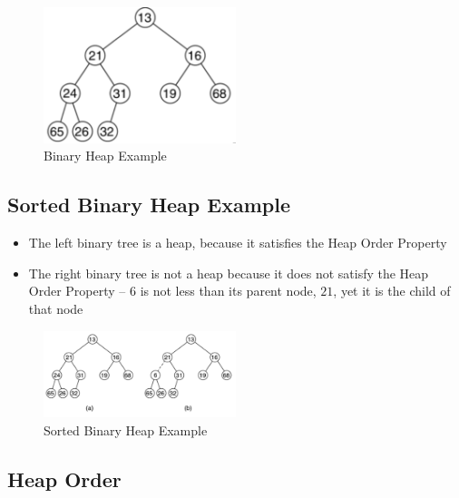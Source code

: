 \documentclass[
  10pt,
  english,
  letterpaper,
,tablecaptionabove
]{scrartcl}
\providecommand{\tightlist}{%
  \setlength{\itemsep}{0pt}\setlength{\parskip}{0pt}}
\begin{document}
\begin{figure}
\centering
\includegraphics[width=0.5\textwidth,height=\textheight]{images/2.png}
\caption{Binary Heap Example}
\end{figure}

\hypertarget{sorted-binary-heap-example}{%
\subsection{Sorted Binary Heap
Example}\label{sorted-binary-heap-example}}

\begin{itemize}
\tightlist
\item
  The left binary tree is a heap, because it satisfies the Heap Order
  Property
\item
  The right binary tree is not a heap because it does not satisfy the
  Heap Order Property -- \(6\) is not less than its parent node, \(21\),
  yet it is the child of that node
\end{itemize}

\begin{figure}
\centering
\includegraphics[width=0.5\textwidth,height=\textheight]{images/3.png}
\caption{Sorted Binary Heap Example}
\end{figure}

\hypertarget{heap-order}{%
\subsection{Heap Order}\label{heap-order}}
\end{document}
